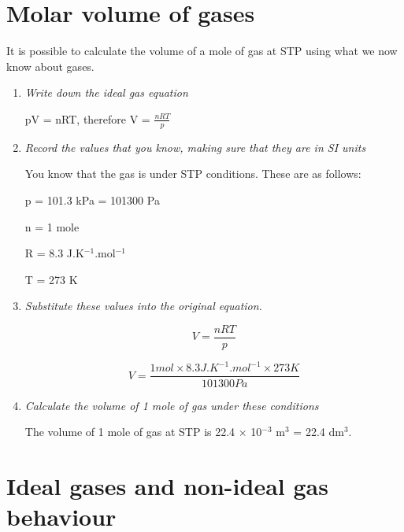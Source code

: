 
\section{Molar volume of gases}
\label{sec:gases:molar volume}

It is possible to calculate the volume of a mole of gas at STP using what we now know about gases. 

\begin{enumerate}

\item{\textit{Write down the ideal gas equation}}
\begin{center}
pV = nRT, therefore V = $\frac{nRT}{p}$
\end{center}

\item{\textit{Record the values that you know, making sure that they are in SI units}}

You know that the gas is under STP conditions. These are as follows:

p = 101.3 kPa = 101300 Pa

n = 1 mole

R = 8.3 J.K$^{-1}$.mol$^{-1}$

T = 273 K

\item{\textit{Substitute these values into the original equation.}}

\begin{equation*}
V = \frac{nRT}{p}
\end{equation*}

\begin{equation*}
V = \frac{1 mol \times 8.3 J.K^{-1}.mol^{-1} \times 273 K}{101300 Pa}
\end{equation*}

\item{\textit{Calculate the volume of 1 mole of gas under these conditions}

The volume of 1 mole of gas at STP is 22.4 $\times$ 10$^{-3}$ m$^{3}$ = 22.4 dm$^{3}$.}
\end{enumerate}







\section{Ideal gases and non-ideal gas behaviour}
\label{sec:gases:ideal}

